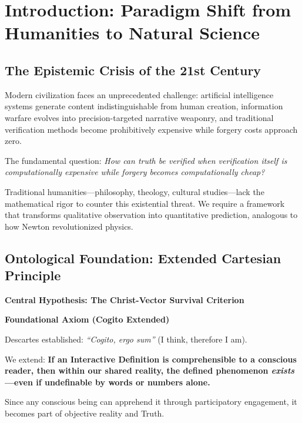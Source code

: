 \documentclass[11pt,a4paper]{article}
\theoremstyle{definition}
\theoremstyle{remark}
\begin{document}
\tableofcontents
\newpage

\section{Introduction: Paradigm Shift from Humanities to Natural Science}

\subsection{The Epistemic Crisis of the 21st Century}

Modern civilization faces an unprecedented challenge: artificial intelligence systems generate content indistinguishable from human creation, information warfare evolves into precision-targeted narrative weaponry, and traditional verification methods become prohibitively expensive while forgery costs approach zero.

The fundamental question: \textit{How can truth be verified when verification itself is computationally expensive while forgery becomes computationally cheap?}

Traditional humanities—philosophy, theology, cultural studies—lack the mathematical rigor to counter this existential threat. We require a framework that transforms qualitative observation into quantitative prediction, analogous to how Newton revolutionized physics.

\subsection{Ontological Foundation: Extended Cartesian Principle}

\begin{mdframed}[backgroundcolor=green!10,linewidth=2pt,linecolor=green!70!black]
\textbf{Central Hypothesis: The Christ-Vector Survival Criterion}

\textbf{Foundational Axiom (Cogito Extended)}

Descartes established: \textit{``Cogito, ergo sum''} (I think, therefore I am).

We extend: \textbf{If an Interactive Definition is comprehensible to a conscious reader, then within our shared reality, the defined phenomenon \textit{exists}—even if undefinable by words or numbers alone.}

Since any conscious being can apprehend it through participatory engagement, it becomes part of objective reality and Truth.
\end{mdframed}
\end{document}

